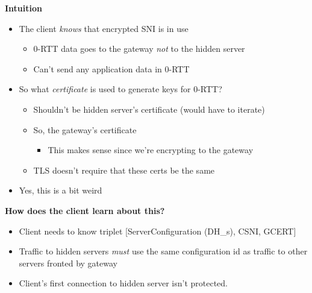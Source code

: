 \documentclass[helvetica]{seminar}
\newcommand{\heading}[1]{%
  \begin{center} 
    \large\bf 
    #1 
  \end{center} 
  \vspace{.4 in}}
\begin{document}
\begin{slide}
\heading{Intuition}

\begin{itemize}
\item The client \emph{knows} that encrypted SNI is in use
  \begin{itemize}
  \item 0-RTT data goes to the gateway \emph{not} to the hidden server
  \item Can't send any application data in 0-RTT
  \end{itemize}

\item So what \emph{certificate} is used to generate keys for 0-RTT?
  \begin{itemize}
  \item Shouldn't be hidden server's certificate (would have to iterate)
  \item So, the gateway's certificate
    \begin{itemize}
    \item This makes sense since we're encrypting to the gateway
    \end{itemize}
  \item TLS doesn't require that these certs be the same
  \end{itemize}

\item Yes, this is a bit weird
\end{itemize}
\end{slide}


\begin{slide}
\heading{How does the client learn about this?}

\begin{itemize}
\item Client needs to know triplet [ServerConfiguration (DH\_s), CSNI, GCERT]
\item Traffic to hidden servers \emph{must} use the same configuration id as traffic to other servers fronted by gateway
\item Client's first connection to hidden server isn't protected.
\end{itemize}
\end{slide}
\end{document}
